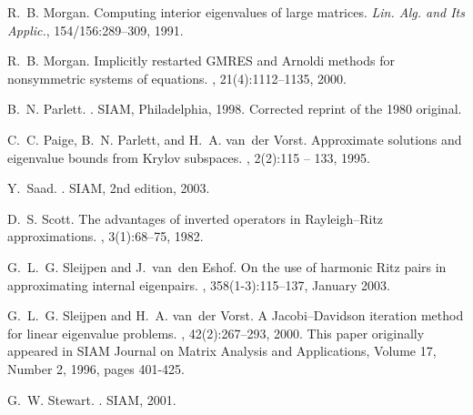\documentclass{article}
\begin{document}
\begin{thebibliography}{100}
 R.~B. Morgan. \newblock Computing interior eigenvalues of large matrices. \newblock
{\em Lin. Alg. and Its Applic.}, 154/156:289--309, 1991.
	
 R.~B. Morgan. \newblock Implicitly restarted {GMRES} and {Arnoldi} methods for
nonsymmetric
systems of equations.
,
21(4):1112--1135, 2000.
	

	
	 B.~N. Parlett. . \newblock SIAM,
	Philadelphia, 1998. \newblock Corrected reprint of the 1980 original.

 C.~C. Paige, B.~N. Parlett, and H.~A. van~der Vorst. \newblock Approximate
solutions and eigenvalue bounds from {Krylov} subspaces. , 2(2):115 -- 133,
1995.
	
	 Y.~Saad. . \newblock SIAM,
	2nd edition, 2003.
	
	
	 D.~S. Scott. \newblock The advantages of inverted operators in {Rayleigh--Ritz}
	approximations.
	,
	3(1):68--75, 1982.
		
	
	 G.~L.~G. Sleijpen and J.~van~den Eshof. \newblock On the use of harmonic {Ritz}
	pairs in approximating internal
	eigenpairs.
	, 358(1-3):115--137, January
	2003.
	
	 G.~L.~G. Sleijpen and H.~A. van~der Vorst. \newblock A {Jacobi--Davidson}
	iteration method for linear eigenvalue problems. , 42(2):267--293, 2000. \newblock
	This paper originally appeared in SIAM Journal on Matrix Analysis and
	Applications, Volume 17, Number 2, 1996, pages 401-425.
	

	

	
	 G.~W. Stewart. . \newblock
	SIAM, 2001.
	
	
	
	
	
	

	

	
	
	

	

	

	

	

	

	
	
	\markboth{}{}
	
\end{thebibliography}
\end{document}
